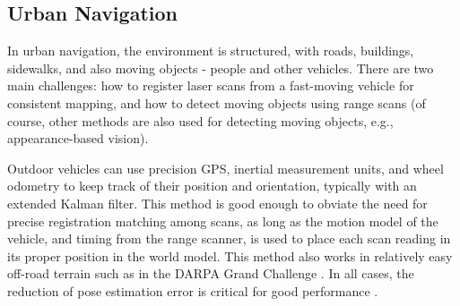 \documentclass[twocolumn,oneside]{book}
\begin{document}
%
%
%



\subsection{Urban Navigation}

In urban navigation, the environment is structured, with roads,
buildings, sidewalks, and also moving objects - people and other
vehicles.  There are two main challenges: how to register laser scans
from a fast-moving vehicle for consistent mapping, and how to detect
moving objects using range scans (of course, other methods are also
used for detecting moving objects, e.g., appearance-based vision).

Outdoor vehicles can use precision GPS, inertial measurement units,
and wheel odometry to keep track of their position and orientation,
typically with an extended Kalman filter.  This method is good enough
to obviate the need for precise registration matching among scans, as
long as the motion model of the vehicle, and timing from the range
scanner, is used to place each scan reading in its proper position in
the world model.  This method also works in relatively easy off-road
terrain such as in the DARPA Grand Challenge
\cite{GrandChallenge}.  In all cases, the reduction of pose
estimation error is critical for good performance
\cite{thrun06}. 
\end{document}
